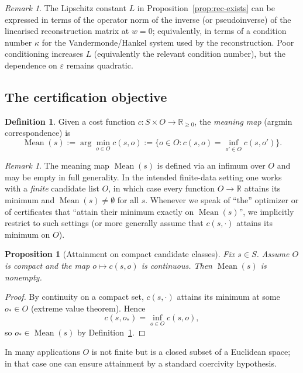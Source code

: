 \documentclass[11pt,reqno]{amsart}
\newtheorem{proposition}[theorem]{Proposition}
\theoremstyle{definition}
\newtheorem{definition}[theorem]{Definition}
\theoremstyle{remark}
\newtheorem{remark}[theorem]{Remark} %
\newcommand{\R}{\mathbb{R}}
\newcommand{\1}{\mathbf{1}}
\newcommand{\Mean}{\operatorname{Mean}}
\begin{document}
\begin{remark}\label{rem:conditioning}
The Lipschitz constant $L$ in Proposition~\ref{prop:rec-exists} can be expressed in terms of the operator norm of
the inverse (or pseudoinverse) of the linearised reconstruction matrix at $w=0$; equivalently, in
terms of a condition number $\kappa$ for the Vandermonde/Hankel system used by the reconstruction.
Poor conditioning increases $L$ (equivalently the relevant condition number), but the dependence on $\varepsilon$ remains quadratic.
\end{remark}

\subsection{The certification objective}

\begin{definition}\label{def:meaning}
Given a cost function $c:S\times O\to\R_{\ge 0}$, the \emph{meaning map} (argmin correspondence) is
\[\Mean(s):=\arg\min_{o\in O} c(s,o):=\{o\in O: c(s,o)=\inf_{o'\in O}c(s,o')\}.\]
\end{definition}

\begin{remark}\label{rem:attainment}
The meaning map $\Mean(s)$ is defined via an infimum over $O$ and may be empty in full generality.
In the intended finite-data setting one works with a \emph{finite} candidate list $O$, in which case
every function $O\to\R$ attains its minimum and $\Mean(s)\neq\emptyset$ for all $s$.
Whenever we speak of ``the'' optimizer or of certificates that ``attain their minimum exactly on $\Mean(s)$'',
we implicitly restrict to such settings (or more generally assume that $c(s,\cdot)$ attains its minimum on $O$).
\end{remark}


\begin{proposition}[Attainment on compact candidate classes]\label{prop:meaning-compact}
Fix $s\in S$.
Assume $O$ is compact and the map $o\mapsto c(s,o)$ is continuous.
Then $\Mean(s)$ is nonempty.
\end{proposition}

\begin{proof}
By continuity on a compact set, $c(s,\cdot)$ attains its minimum at some $o_\ast\in O$
(extreme value theorem).
Hence
\[
c(s,o_\ast)=\inf_{o\in O}c(s,o),
\]
so $o_\ast\in\Mean(s)$ by Definition~\ref{def:meaning}.
\end{proof}


In many applications $O$ is not finite but is a closed subset of a Euclidean space; in that case one can ensure attainment by a standard coercivity hypothesis.
\end{document}
